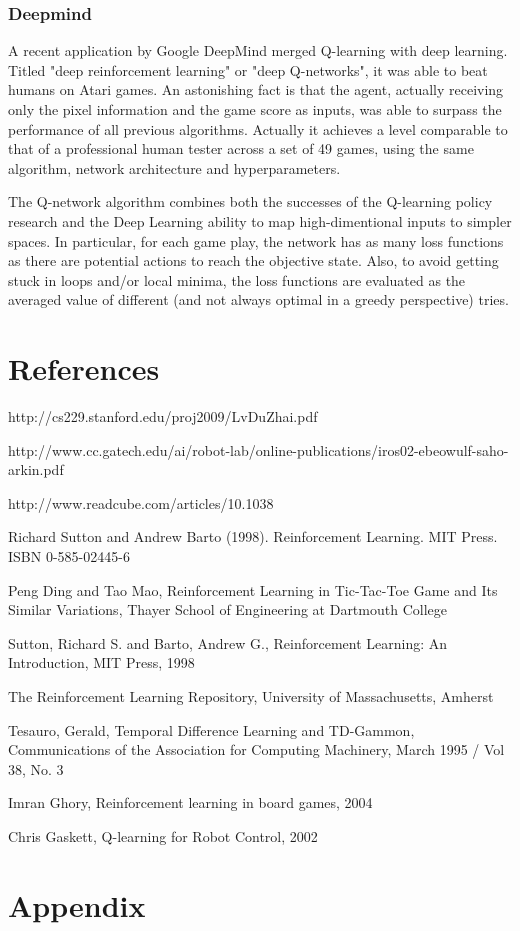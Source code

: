 \documentclass[fleqn]{article}
\begin{document}
\subsubsection{Deepmind}
A recent application by Google DeepMind merged Q-learning with deep learning. Titled "deep reinforcement learning" or "deep Q-networks", it was able to beat humans on Atari games. An astonishing fact is that the agent, actually receiving only the pixel information and the game score as inputs, was able to surpass the performance of all previous algorithms. Actually it achieves a level comparable to that of a professional human tester across a set of 49 games, using the same algorithm, network architecture and hyperparameters. 

The Q-network algorithm combines both the successes of the Q-learning policy research and the Deep Learning ability to map high-dimentional inputs to simpler spaces. In particular, for each game play, the network has as many loss functions as there are potential actions to reach the objective state. Also, to avoid getting stuck in loops and/or local minima, the loss functions are evaluated as the averaged value of different (and not always optimal in a greedy perspective) tries.

\pagebreak
\section*{References}
http://cs229.stanford.edu/proj2009/LvDuZhai.pdf

http://www.cc.gatech.edu/ai/robot-lab/online-publications/iros02-ebeowulf-saho-arkin.pdf

http://www.readcube.com/articles/10.1038%

Richard Sutton and Andrew Barto (1998). Reinforcement Learning. MIT Press. ISBN 0-585-02445-6

Peng Ding and Tao Mao, Reinforcement Learning in Tic-Tac-Toe Game and Its Similar Variations, Thayer School of Engineering at Dartmouth College  

Sutton, Richard S. and Barto, Andrew G., Reinforcement Learning: An Introduction, MIT Press, 1998  

The Reinforcement Learning Repository, University of Massachusetts, Amherst  

Tesauro, Gerald, Temporal Difference Learning and TD-Gammon, Communications of the Association for Computing Machinery, March 1995 / Vol 38, No. 3  

Imran Ghory, Reinforcement learning in board games, 2004   

Chris Gaskett, Q-learning for Robot Control, 2002

\pagebreak
\section*{Appendix}
	

	
\end{document}
